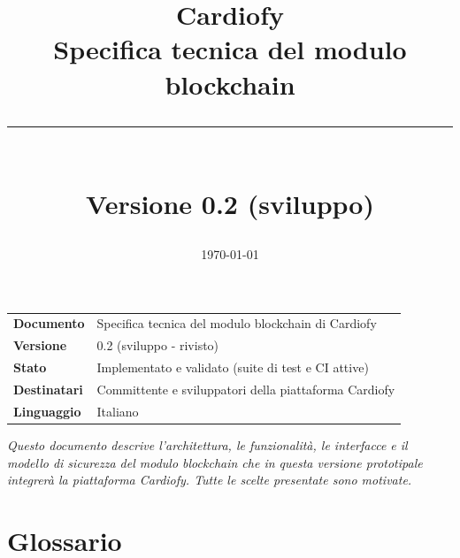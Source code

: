 \documentclass[a4paper,11pt]{article}
\title{
    \vspace{-1cm}
    \textsf{\Huge Cardiofy} \\[0.4em]
    \textsf{\Large Specifica tecnica del modulo blockchain} \\[0.6em]
    \rule{0.6\textwidth}{0.4pt} \\[0.4em]
    \normalsize Versione 0.2 (sviluppo)
}
\author{}
\date{\today}
\begin{document}
\maketitle
\thispagestyle{empty}
\vspace{1cm}

\begin{center}
\begin{tabularx}{0.75\textwidth}{lX}
\toprule
\textbf{Documento} & Specifica tecnica del modulo blockchain di Cardiofy \\
\textbf{Versione} & 0.2 (sviluppo - rivisto) \\
\textbf{Stato} & Implementato e validato (suite di test e CI attive) \\
\textbf{Destinatari} & Committente e sviluppatori della piattaforma Cardiofy \\
\textbf{Linguaggio} & Italiano \\
\bottomrule
\end{tabularx}
\end{center}

\vspace{2cm}

\noindent\textit{Questo documento descrive l'architettura, le funzionalità, le interfacce e il modello di sicurezza del modulo blockchain che in questa versione prototipale integrer\`a la piattaforma Cardiofy. Tutte le scelte presentate sono motivate.}

\newpage
\tableofcontents
\newpage

\section{Glossario}\label{sec:glossario}
\end{document}
